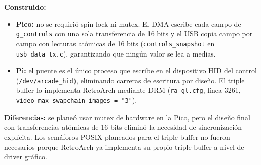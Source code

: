 \textbf{Construido:}
\begin{itemize}
	\item \textbf{Pico:} no se requirió spin lock ni mutex. El DMA escribe cada campo de \texttt{g\_controls} con una sola transferencia de 16 bits y el USB copia campo por campo con lecturas atómicas de 16 bits (\texttt{controls\_snapshot} en \texttt{usb\_data\_tx.c}), garantizando que ningún valor se lea a medias.
	\item \textbf{Pi:} el puente es el único proceso que escribe en el dispositivo HID del control (\texttt{/dev/arcade\_hid}), eliminando carreras de escritura por diseño. El triple buffer lo implementa RetroArch mediante DRM (\texttt{ra\_gl.cfg}, línea 3261, \texttt{video\_max\_swapchain\_images = "3"}).
\end{itemize}

\textbf{Diferencias:} se planeó usar mutex de hardware en la Pico, pero el diseño final con transferencias atómicas de 16 bits eliminó la necesidad de sincronización explícita. Los semáforos POSIX planeados para el triple buffer no fueron necesarios porque RetroArch ya implementa su propio triple buffer a nivel de driver gráfico.
